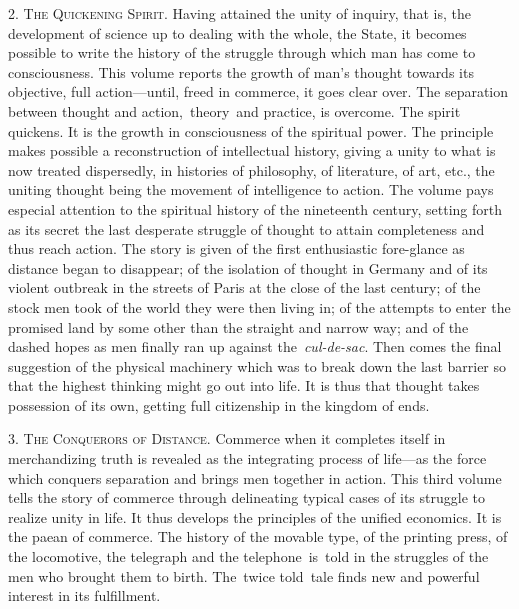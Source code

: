 \documentclass[twoside,symmetric,nobib,justified]{tufte-book}
\begin{document}
\vspace{0.05in}

2. \textsc{The Quickening Spirit}. Having attained the unity of inquiry, that is,
the development of science up to dealing with the whole, the State, it
becomes possible to write the history of the struggle through which man
has come to consciousness. This volume reports the growth of man's
thought towards its objective, full action---until, freed in commerce,
it goes clear over. The separation between thought and
action,~theory~and practice, is overcome. The spirit quickens. It is the
growth in consciousness of the spiritual power. The principle makes
possible a reconstruction of intellectual history, giving a unity to
what is now treated dispersedly, in histories of philosophy, of
literature, of art, etc., the uniting thought being the movement of
intelligence to action. The volume pays especial attention to the
spiritual history of the nineteenth century, setting forth as its secret
the last desperate struggle of thought to attain completeness and thus
reach action. The story is given of the first enthusiastic fore-glance
as distance began to disappear; of the isolation of thought in Germany
and of its violent outbreak in the streets of Paris at the close of the
last century; of the stock men took of the world they were then living
in; of the attempts to enter the promised land by some other than the
straight and narrow way; and of the dashed hopes as men finally ran up
against the~\emph{cul-de-sac}. Then comes the final suggestion of the
physical machinery which was to break down the last barrier so that the
highest thinking might go out into life. It is thus that thought takes
possession of its own, getting full citizenship in the kingdom of ends.~

\vspace{0.05in}

3. \textsc{The Conquerors of Distance}. Commerce when it completes itself in
merchandizing truth is revealed as the integrating process of life---as
the force which conquers separation and brings men together in action.
This third volume tells the story of commerce through delineating
typical cases of its struggle to realize unity in life. It thus develops
the principles of the unified economics. It is the paean of commerce.
The history of the movable type, of the printing press, of the
locomotive, the telegraph and the telephone~is~told in the struggles of
the men who brought them to birth. The~twice told~tale finds new and
powerful interest in its fulfillment. ~
\end{document}
